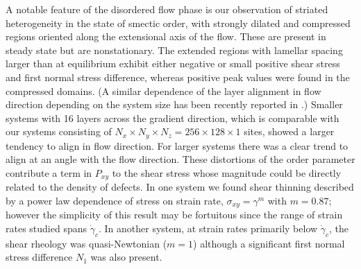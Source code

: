 \documentclass[8.5pt,twoside,twocolumn]{article}
\begin{document}
A notable feature of the disordered flow phase is our observation of striated heterogeneity in the state of smectic order, with strongly dilated and compressed regions oriented along the extensional axis of the flow.  These are present in steady state but are nonstationary. The extended regions with lamellar spacing larger than at equilibrium exhibit either negative or small positive shear stress and first normal stress difference, whereas positive peak values were found in the compressed domains.
(A similar dependence of the layer alignment in flow direction depending on the system size has been recently reported in \cite{Kumaran2011}.)
Smaller systems with 16 layers across the gradient direction, which is comparable with our systems consisting of  $N_x\times N_y \times N_z=256\times128\times1$ sites, showed a larger tendency to align in flow direction.
For larger systems there was a clear trend to align at an angle with the flow direction.
These distortions of the order parameter contribute a term in $P_{xy}$ to the shear stress whose magnitude could be directly related to the density of defects. In one system we found shear thinning described by a power law dependence of stress on strain rate, $\sigma_{xy}=\gamma^m$ with $m=0.87$; however the simplicity of this result may be fortuitous since the range of strain rates studied spans $\dot\gamma_c$. In another system, at strain rates primarily below $\dot\gamma_c$, the shear rheology was quasi-Newtonian ($m=1$) although a significant first normal stress difference $N_1$ was also present.
\end{document}
